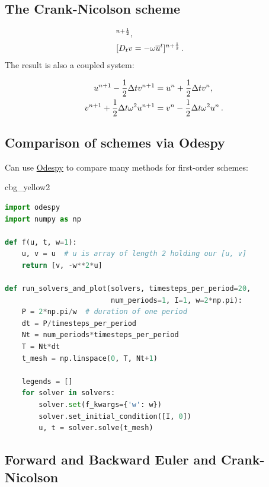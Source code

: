 \documentclass[%
oneside,                 %
final,                   %
10pt]{article}
\newenvironment{_cod_tight}[1]{
   \def\FrameCommand{\colorbox{#1}}
   \FrameRule0.6pt\MakeFramed {\FrameRestore}\vskip3mm}
   {\vskip0mm\endMakeFramed}
\newenvironment{cod}[1]{
\bgroup\rmfamily
\fboxsep=0mm\relax
\begin{_cod_tight}{#1}
\list{}{\parsep=-2mm\parskip=0mm\topsep=0pt\leftmargin=2mm
\rightmargin=2\leftmargin\leftmargin=4pt\relax}
\item\relax}
{\endlist\end{_cod_tight}\egroup}
\begin{document}
\subsection*{The Crank-Nicolson scheme}

\begin{align}
[D_t u &= \overline{v}^t]^{n+\half},\\ 
[D_t v &= -\omega \overline{u}^t]^{n+\half}
\tp
\end{align}
The result is also a coupled system:

\begin{align}
u^{n+1} - \half\Delta t v^{n+1} &= u^{n} + \half\Delta t v^{n},\\ 
v^{n+1} + \half\Delta t \omega^2 u^{n+1} &= v^{n}
- \half\Delta t \omega^2 u^{n}
\tp
\end{align}

\subsection*{Comparison of schemes via Odespy}

Can use
\href{{https://github.com/hplgit/odespy}}{Odespy} to compare many methods
for first-order schemes:

\begin{cod}{cbg_yellow2}\begin{lstlisting}[language=Python,style=simple,xleftmargin=2mm]
import odespy
import numpy as np

def f(u, t, w=1):
    u, v = u  # u is array of length 2 holding our [u, v]
    return [v, -w**2*u]

def run_solvers_and_plot(solvers, timesteps_per_period=20,
                         num_periods=1, I=1, w=2*np.pi):
    P = 2*np.pi/w  # duration of one period
    dt = P/timesteps_per_period
    Nt = num_periods*timesteps_per_period
    T = Nt*dt
    t_mesh = np.linspace(0, T, Nt+1)

    legends = []
    for solver in solvers:
        solver.set(f_kwargs={'w': w})
        solver.set_initial_condition([I, 0])
        u, t = solver.solve(t_mesh)
\end{lstlisting}\end{cod}
\noindent

\subsection*{Forward and Backward Euler and Crank-Nicolson}
\end{document}

